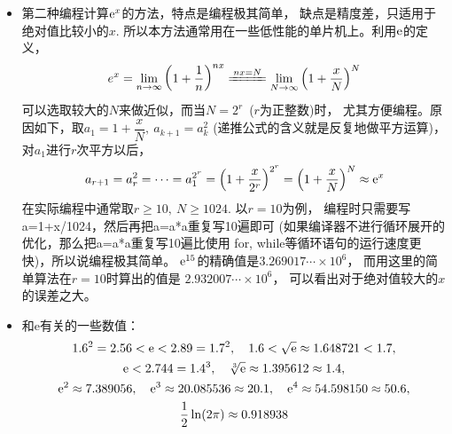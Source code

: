 \begin{itemize}[leftmargin=\inteval{\myitemleftmargin}pt,itemsep=
   \inteval{\myitemitempsep}pt,topsep=\inteval{\myitemtopsep}pt]
\item 第二种编程计算$ \mathrm{e}^x $的方法，特点是编程极其简单，
缺点是精度差，只适用于绝对值比较小的$ x $. 
所以本方法通常用在一些低性能的单片机上。利用$ \mathrm{e} $的定义，
\begin{gather*}
    e^x=\lim_{n\to\infty}\left(1+ \dfrac{1}{n}\right)^{nx}\xlongequal{nx=N}
    \lim_{N\to\infty}\left(1+\dfrac{x}{N}\right)^{N}
\end{gather*}
可以选取较大的$ N $来做近似，而当$ N=2^r $\ ($ r $为正整数)时，
尤其方便编程。原因如下，取$ a_1=1+\dfrac{x}{N},\ a_{k+1}=a_k^2 $
(递推公式的含义就是反复地做平方运算)，对$ a_1 $进行$ r $次平方以后，
\begin{gather}\label{exp(x)快速算法}
    a_{r+1}=a_r^2=\cdots=a_1^{2^{r}}=\left(1+\dfrac{x}{2^r}\right)^{2^r}=
    \left(1+\dfrac{x}{N}\right)^{N}\approx \mathrm{e}^x
\end{gather}
在实际编程中通常取$ r\geq 10,\ N\geq 1024 $. 以$ r=10 $为例，
编程时只需要写a=1+x/1024，然后再把a=a*a重复写10遍即可
(如果编译器不进行循环展开的优化，那么把a=a*a重复写10遍比使用
for, while等循环语句的运行速度更快)，所以说编程极其简单。
$ \mathrm{e}^{15} $的精确值是$ 3.269017\cdots \times 10^6 $，
而用这里的简单算法在$ r=10 $时算出的值是
$ 2.932007\cdots\times10^6 $，
可以看出对于绝对值较大的$ x $的误差之大。

\item 和e有关的一些数值：
\begin{gather*}
    1.6^2=2.56<\mathrm{e}<2.89=1.7^2,\quad 1.6<\sqrt{\mathrm{e}}\approx 1.648721<1.7, \\
    \mathrm{e}<2.744=1.4^3,\quad \sqrt[3]{\mathrm{e}}\approx 1.395612\approx 1.4, \\    
    \mathrm{e}^2\approx 7.389056,\quad  \mathrm{e}^3\approx 20.085536\approx 20.1 ,
    \quad \mathrm{e}^4\approx 54.598150\approx 50.6, \\
    \dfrac{1}{2}\ln(2\pi)\approx 0.918938
\end{gather*}


\end{itemize}
